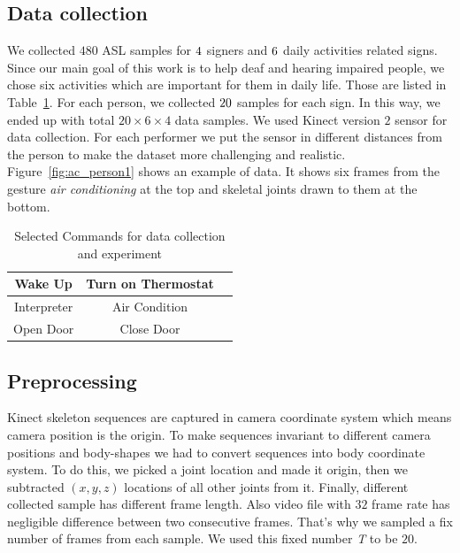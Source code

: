 \documentclass[10pt,twocolumn,letterpaper]{article}
\begin{document}
\subsection{Data collection}
We collected $480$ ASL samples for $\number4$ signers and $\number6$ daily activities related signs. Since our main goal of this work is to help deaf and hearing impaired people, we chose six activities which are important for them in daily life. Those are listed in Table~\ref{table:asl_signs}. For each person, we collected $\number20$ samples for each sign. In this way, we ended up with total $20 \times 6 \times 4$ data samples. We used Kinect version $2$ sensor for data collection. For each performer we put the sensor in different distances from the person to make the dataset more challenging and realistic. Figure~\ref{fig:ac_person1} shows an example of data. It shows six frames from the gesture \textit{air conditioning} at the top and skeletal joints drawn to them at the bottom.

\begin{table}[h]
	\begin{center}
		\begin{tabular}{|c|c|c}
			\hline
			Wake Up & Turn on Thermostat\\
			\hline
			Interpreter & Air Condition\\
			\hline
			Open Door & Close Door\\
			\hline
		\end{tabular}
	\end{center}
	\caption{Selected Commands for data collection and experiment}
	\label{table:asl_signs}
\end{table}

\subsection{Preprocessing}
Kinect skeleton sequences are captured in camera coordinate system which means camera position is the origin. To make sequences invariant to different camera positions and body-shapes we had to convert sequences into body coordinate system. To do this, we picked a joint location and made it origin, then we subtracted $(x, y, z)$ locations of all other joints from it. Finally, different collected sample has different frame length. Also video file with $32$ frame rate has negligible difference between two consecutive frames. That's why we sampled a fix number of frames from each sample. We used this fixed number \textit{T} to be $20$. 
\end{document}
